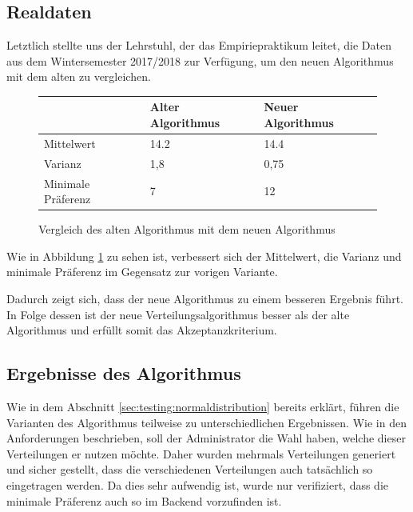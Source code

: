 		\subsection{Realdaten}
		
			Letztlich stellte uns der Lehrstuhl, der das Empiriepraktikum leitet, die Daten aus dem Wintersemester 2017/2018 zur Verfügung, um den neuen Algorithmus mit dem alten zu vergleichen.\newline
			
			\begin{figure}
				\centering
				\begin{tabular}{l|l|l}
					& Alter Algorithmus & Neuer Algorithmus \\
					\hline
					Mittelwert & 14.2 & 14.4 \\
					Varianz & 1,8 & 0,75 \\
					Minimale Präferenz & 7 & 12 \\
				\end{tabular}
				\caption{Vergleich des alten Algorithmus mit dem neuen Algorithmus}
				\label{tab:old_versus_new_algorithm}
			\end{figure}
		
			Wie in Abbildung \ref{tab:old_versus_new_algorithm} zu sehen ist, verbessert sich der Mittelwert, die Varianz und minimale Präferenz im Gegensatz zur vorigen Variante.\newline
			
			Dadurch zeigt sich, dass der neue Algorithmus zu einem besseren Ergebnis führt.
			In Folge dessen ist der neue Verteilungsalgorithmus besser als der alte Algorithmus und erfüllt somit das Akzeptanzkriterium.
			
		\subsection{Ergebnisse des Algorithmus}
			
			Wie in dem Abschnitt \ref{sec:testing:normaldistribution} bereits erklärt, führen die Varianten des Algorithmus teilweise zu unterschiedlichen Ergebnissen.
			Wie in den Anforderungen beschrieben, soll der Administrator die Wahl haben, welche dieser Verteilungen er nutzen möchte.
			Daher wurden mehrmals Verteilungen generiert und sicher gestellt, dass die verschiedenen Verteilungen auch tatsächlich so eingetragen werden.
			Da dies sehr aufwendig ist, wurde nur verifiziert, dass die minimale Präferenz auch so im Backend vorzufinden ist.\newline

